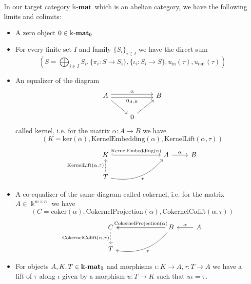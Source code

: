 \begin{example}
In our target category $\Bbbk\textnormal{-}\mathbf{mat}$ which is an abelian category, we have the following limits and colimits:
\begin{itemize}
\item A zero object $0 \in \Bbbk\textnormal{-}\mathbf{mat}_{0}$
\item For every finite set $I$ and family $\{S_{i}\}_{i \in I}$ we have the direct sum
\[
(S = \bigoplus_{i\in I} S_{i}, \{\pi_{i} : S \rightarrow S_{i}\}, \{\iota_{i} : S_{i} \rightarrow S\}, u_{\text{in}}(\tau), u_{\text{out}}(\tau))
\]
\item An equalizer of the diagram 
\[
\begin{tikzcd}
A \arrow[rr, "{0_{A,B}}"', shift right] \arrow[rd] \arrow[rr, "\alpha", shift left] &              & B \\
                                                                               & 0 \arrow[ru] &  
\end{tikzcd}
\]
called kernel, i.e. for the matrix $\alpha : A \rightarrow B$ we have
\[
(K = \mathrm{ker}(\alpha), \mathrm{KernelEmbedding}(\alpha), \mathrm{KernelLift}(\alpha,\tau))
\]
\[
\begin{tikzcd}
K \arrow[rrr, "{\mathrm{KernelEmbedding}(\alpha)}", hook]                              &  &  & A \arrow[r, "\alpha"] & B \\
T \arrow[rrru, "\tau"', bend right] \arrow[u, "{\mathrm{KernelLift}(\alpha,\tau)}", dashed] &  &  &                       &  
\end{tikzcd}
\]
\item A co-equalizer of the same diagram called cokernel, i.e. for the matrix $A \in \Bbbk^{m\times n}$ we have
\[
(C = \mathrm{coker}(\alpha), \mathrm{CokernelProjection}(\alpha), \mathrm{CokernelColift}(\alpha,\tau))
\]
\[
\begin{tikzcd}
C \arrow[d, "{\mathrm{CokernelColift}(\alpha,\tau)}"', dashed] &  &  & B \arrow[lll, "\mathrm{CokernelProjection}(\alpha)"', two heads] \arrow[llld, "\tau", bend left] & A \arrow[l, "\alpha"'] \\
T                                                              &  &  &                                                                                       &                       
\end{tikzcd}
\]
\item For objects $A, K, T \in \Bbbk\textnormal{-}\mathbf{mat}_{0}$ and morphisms $\iota : K \rightarrow A, \tau : T \rightarrow A$ we have a lift of $\tau$ along $\iota$
given by a morphism $u : T \rightarrow K$ such that $u \iota = \tau$.

\end{itemize}
\end{example}
